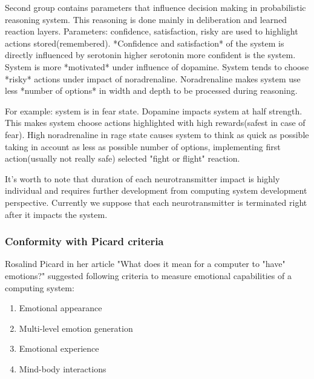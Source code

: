 Second group contains parameters that influence decision making in probabilistic reasoning system. This reasoning is done mainly in deliberation and learned reaction layers.
Parameters: confidence, satisfaction, risky are used to highlight actions stored(remembered).
*Confidence and satisfaction* of the system is directly influenced by serotonin higher serotonin more confident is the system.
System is more *motivated* under influence of dopamine.
System tends to choose *risky* actions under impact of noradrenaline.
Noradrenaline makes system use less *number of options* in width and depth to be processed during reasoning.

For example: system is in fear state. Dopamine impacts system at half strength. This makes system choose actions highlighted with high rewards(safest in case of fear). High noradrenaline in rage state causes system to think as quick as possible taking in account as less as possible number of options, implementing first action(usually not really safe) selected "fight or flight" reaction.

It's worth to note that duration of each neurotransmitter impact is highly individual and requires further development from computing system development perspective. Currently we suppose that each neurotransmitter is terminated right after it impacts the system.

\subsubsection{Conformity with Picard criteria}

Rosalind Picard in her article "What does it mean for a computer to "have" emotions?"\cite{whatdoesitmeanforcomputer} suggested following criteria to measure emotional capabilities of a computing system:

\begin{enumerate}
\item  Emotional appearance
\item  Multi-level emotion generation
\item  Emotional experience
\item  Mind-body interactions
\end{enumerate}

